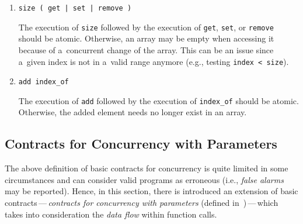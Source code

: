 \begin{example}
\begin{enumerate}[label={($ \varrho_{\arabic*} $)}]
        \item \texttt{size (\,get\,|\,set\,|\,remove\,)}
            \begin{addmargin}[1em]{0em}
                The execution of \texttt{size} followed by the execution of \texttt{get}, \texttt{set}, or \texttt{remove} should be atomic. Otherwise, an array may be empty when accessing it because of a~concurrent change of the array. This can be an issue since a~given index is not in a~valid range anymore (e.g., testing \texttt{index < size}).
            \end{addmargin}

        \item \texttt{add index\_of}
            \begin{addmargin}[1em]{0em}
                The execution of \texttt{add} followed by the execution of \texttt{index\_of} should be atomic. Otherwise, the added element needs no longer exist in an array.
            \end{addmargin}
    \end{enumerate}
\end{example}

\subsection{Contracts for Concurrency with Parameters}
\label{sec:contractsParams}

The above definition of basic contracts for concurrency is quite limited in some circumstances and can consider valid programs as erroneous (i.e., \emph{false alarms} may be reported). Hence, in this section, there is introduced an extension of basic contracts\,---\,\emph{contracts for concurrency with parameters} (defined in~\cite{contracts2017, contracts2015})\,---\,which takes into consideration the \emph{data flow} within function calls.

